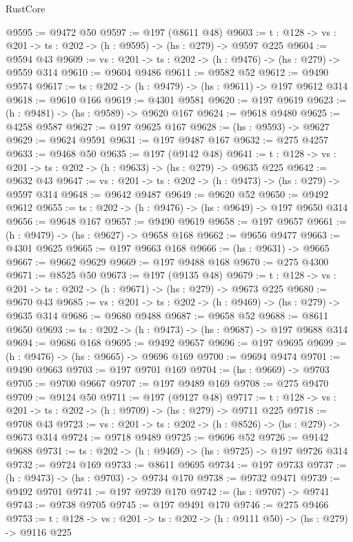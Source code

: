 \begin{lexlean}{RustCore}
\begin{coremodule}
@9595 := @9472 @50
@9597 := @197 (@8611 @48)
@9603 := {t : @128} -> {vs : @201} -> {ts : @202} -> (h : @9595) -> (hs : @279) -> @9597 @225
@9604 := @9594 @43
@9609 := {vs : @201} -> {ts : @202} -> (h : @9476) -> (hs : @279) -> @9559 @314
@9610 := @9604 @9486
@9611 := @9582 @52
@9612 := @9490 @9574
@9617 := {ts : @202} -> (h : @9479) -> (hs : @9611) -> @197 @9612 @314
@9618 := @9610 @166
@9619 := @4301 @9581
@9620 := @197 @9619
@9623 := (h : @9481) -> (hs : @9589) -> @9620 @167
@9624 := @9618 @9480
@9625 := @4258 @9587
@9627 := @197 @9625 @167
@9628 := (hs : @9593) -> @9627
@9629 := @9624 @9591
@9631 := @197 @9487 @167
@9632 := @275 @4257
@9633 := @9468 @50
@9635 := @197 (@9142 @48)
@9641 := {t : @128} -> {vs : @201} -> {ts : @202} -> (h : @9633) -> (hs : @279) -> @9635 @225
@9642 := @9632 @43
@9647 := {vs : @201} -> {ts : @202} -> (h : @9473) -> (hs : @279) -> @9597 @314
@9648 := @9642 @9487
@9649 := @9620 @52
@9650 := @9492 @9612
@9655 := {ts : @202} -> (h : @9476) -> (hs : @9649) -> @197 @9650 @314
@9656 := @9648 @167
@9657 := @9490 @9619
@9658 := @197 @9657
@9661 := (h : @9479) -> (hs : @9627) -> @9658 @168
@9662 := @9656 @9477
@9663 := @4301 @9625
@9665 := @197 @9663 @168
@9666 := (hs : @9631) -> @9665
@9667 := @9662 @9629
@9669 := @197 @9488 @168
@9670 := @275 @4300
@9671 := @8525 @50
@9673 := @197 (@9135 @48)
@9679 := {t : @128} -> {vs : @201} -> {ts : @202} -> (h : @9671) -> (hs : @279) -> @9673 @225
@9680 := @9670 @43
@9685 := {vs : @201} -> {ts : @202} -> (h : @9469) -> (hs : @279) -> @9635 @314
@9686 := @9680 @9488
@9687 := @9658 @52
@9688 := @8611 @9650
@9693 := {ts : @202} -> (h : @9473) -> (hs : @9687) -> @197 @9688 @314
@9694 := @9686 @168
@9695 := @9492 @9657
@9696 := @197 @9695
@9699 := (h : @9476) -> (hs : @9665) -> @9696 @169
@9700 := @9694 @9474
@9701 := @9490 @9663
@9703 := @197 @9701 @169
@9704 := (hs : @9669) -> @9703
@9705 := @9700 @9667
@9707 := @197 @9489 @169
@9708 := @275 @9470
@9709 := @9124 @50
@9711 := @197 (@9127 @48)
@9717 := {t : @128} -> {vs : @201} -> {ts : @202} -> (h : @9709) -> (hs : @279) -> @9711 @225
@9718 := @9708 @43
@9723 := {vs : @201} -> {ts : @202} -> (h : @8526) -> (hs : @279) -> @9673 @314
@9724 := @9718 @9489
@9725 := @9696 @52
@9726 := @9142 @9688
@9731 := {ts : @202} -> (h : @9469) -> (hs : @9725) -> @197 @9726 @314
@9732 := @9724 @169
@9733 := @8611 @9695
@9734 := @197 @9733
@9737 := (h : @9473) -> (hs : @9703) -> @9734 @170
@9738 := @9732 @9471
@9739 := @9492 @9701
@9741 := @197 @9739 @170
@9742 := (hs : @9707) -> @9741
@9743 := @9738 @9705
@9745 := @197 @9491 @170
@9746 := @275 @9466
@9753 := {t : @128} -> {vs : @201} -> {ts : @202} -> (h : @9111 @50) -> (hs : @279) -> @9116 @225

\end{coremodule}
\end{lexlean}
